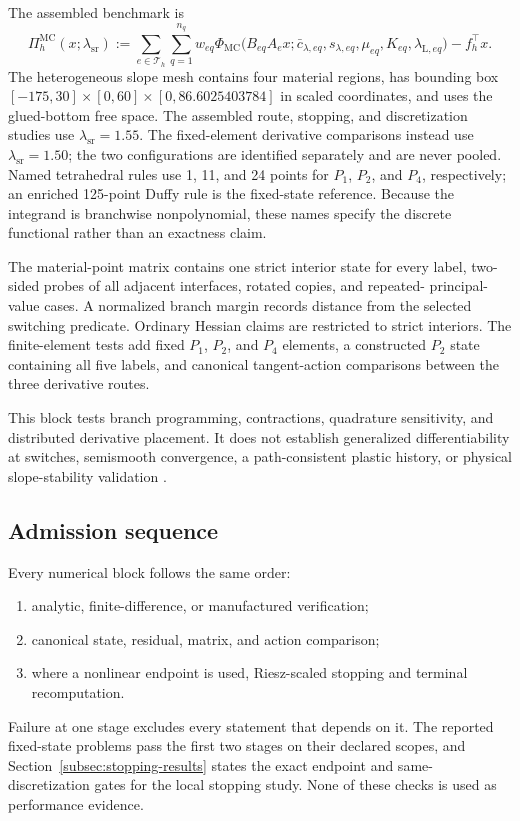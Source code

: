 The assembled benchmark is
\begin{equation}
  \Pi_h^{\mathrm{MC}}(x;\lambda_{\mathrm{sr}})
  :=\sum_{e\in\mathcal{T}_h}\sum_{q=1}^{n_q}
     w_{eq}\Phi_{\mathrm{MC}}
     \bigl(B_{eq}A_e x;\bar c_{\lambda,eq},s_{\lambda,eq},
           \mu_{eq},K_{eq},\lambda_{\mathrm L,eq}\bigr)
     -f_h^\top x.
  \label{eq:plasticity3d-discrete}
\end{equation}
The heterogeneous slope mesh contains four material regions, has bounding box
$[-175,30]\times[0,60]\times[0,86.6025403784]$ in scaled coordinates, and
uses the glued-bottom free space. The assembled route, stopping, and
discretization studies use $\lambda_{\mathrm{sr}}=1.55$. The fixed-element
derivative comparisons instead use $\lambda_{\mathrm{sr}}=1.50$; the two
configurations are identified separately and are never pooled. Named
tetrahedral rules use 1, 11, and 24 points for
$P_1$, $P_2$, and $P_4$, respectively; an enriched 125-point Duffy rule is the
fixed-state reference. Because the integrand is branchwise nonpolynomial, these
names specify the discrete functional rather than an exactness claim.

The material-point matrix contains one strict interior state for every label,
two-sided probes of all adjacent interfaces, rotated copies, and repeated-
principal-value cases. A normalized branch margin records distance from the
selected switching predicate. Ordinary Hessian claims are restricted to strict
interiors. The finite-element tests add fixed $P_1$, $P_2$, and $P_4$ elements,
a constructed $P_2$ state containing all five labels, and canonical
tangent-action comparisons between the three derivative routes.

This block tests branch programming, contractions, quadrature sensitivity, and
distributed derivative placement. It does not establish generalized
differentiability at switches, semismooth convergence, a path-consistent
plastic history, or physical slope-stability validation
\citep{simo1985consistent,simo1998compinel,sysala2017returnmapping}.

\subsection{Admission sequence}
\label{subsec:experiment-admission}

Every numerical block follows the same order:
\begin{enumerate}
  \item analytic, finite-difference, or manufactured verification;
  \item canonical state, residual, matrix, and action comparison;
  \item where a nonlinear endpoint is used, Riesz-scaled stopping and terminal
        recomputation.
\end{enumerate}
Failure at one stage excludes every statement that depends on it. The reported
fixed-state problems pass the first two stages on their declared scopes, and
Section~\ref{subsec:stopping-results} states the exact endpoint and
same-discretization gates for the local stopping study. None of these checks is
used as performance evidence.
